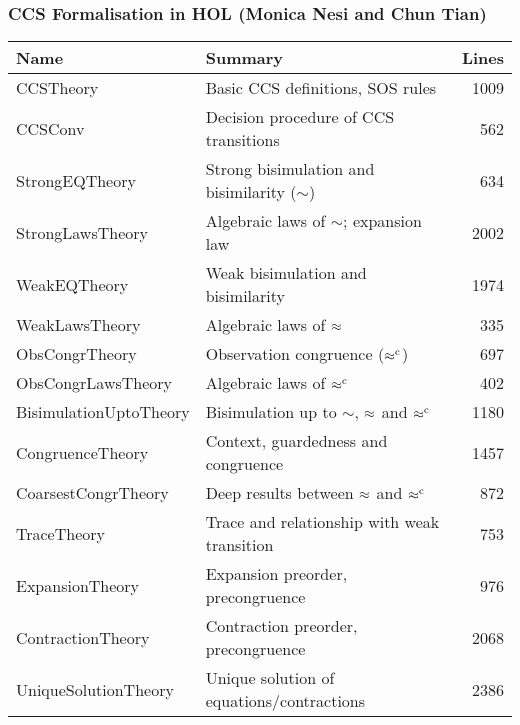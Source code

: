 \begin{frame}
\frametitle{CCS Formalisation in HOL (Monica Nesi and Chun Tian)}
\begin{center}
\begin{small}
\begin{tabular}{|l|l|r|}
\hline
\textbf{Name} & \textbf{Summary} & \textbf{Lines} \\
\hline
CCSTheory & Basic CCS definitions, SOS rules & 1009 \\
CCSConv & Decision procedure of CCS transitions & 562 \\
StrongEQTheory & Strong bisimulation and bisimilarity ($\sim$) & 634 \\
StrongLawsTheory & Algebraic laws of $\sim$; expansion law & 2002 \\
WeakEQTheory & Weak bisimulation and bisimilarity & 1974 \\
WeakLawsTheory & Algebraic laws of $\approx$ & 335 \\
ObsCongrTheory & Observation congruence ($\mathrel{\approx^{\mathrm{c}}}$) & 697 \\
ObsCongrLawsTheory & Algebraic laws of $\mathrel{\approx^{\mathrm{c}}}$ & 402 \\
\hline
BisimulationUptoTheory & Bisimulation up to $\sim$, $\approx$ and $\mathrel{\approx^{\mathrm{c}}}$ & 1180 \\
CongruenceTheory & Context, guardedness and congruence & 1457 \\
CoarsestCongrTheory & Deep results between $\approx$ and $\mathrel{\approx^{\mathrm{c}}}$ & 872 \\
TraceTheory & Trace and relationship with weak transition & 753 \\
ExpansionTheory & Expansion preorder, precongruence & 976 \\
ContractionTheory & Contraction preorder, precongruence & 2068 \\
UniqueSolutionTheory & Unique solution of equations/contractions & 2386 \\
\hline
\end{tabular}
\end{small}
\end{center}
\end{frame}

\def\HOL{\textsc{Hol}}
\newcommand\fun{{\to}}
\newcommand\prd{{\times}}
\newcommand{\ty}[1]{\textsl{#1}}
\newcommand\conj{\ \wedge\ }
\newcommand\disj{\ \vee\ }
\newcommand\imp{ \Rightarrow }
\newcommand\eqv{\ \equiv\ }
\newcommand\vbar{\mid}
\newcommand\turn{\ \vdash\ } %
\newcommand\hilbert{\varepsilon}
\newcommand{\uquant}[1]{\forall #1.\ }
\newcommand{\equant}[1]{\exists #1.\ }
\newcommand{\hquant}[1]{\hilbert #1.\ }
\newcommand{\iquant}[1]{\exists ! #1.\ }
\newcommand{\lquant}[1]{\lambda #1.\ }
\newcommand{\ml}[1]{\mbox{{\def\_{\char'137}\texttt{#1}}}}
\newcommand{\con}[1]{\mathrm{#1}}

